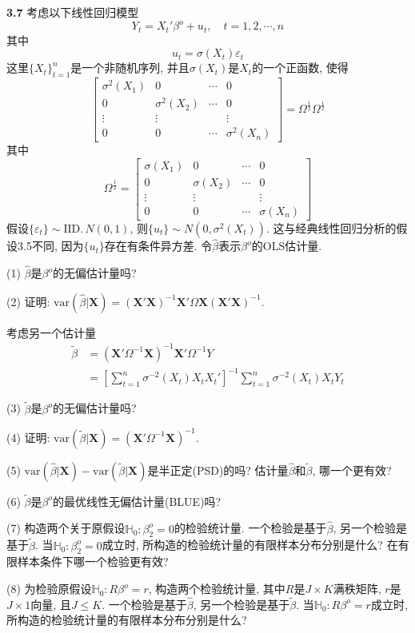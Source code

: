 \documentclass[cn,12pt,math=mtpro2,citestyle=gb7714-2015,bibstyle=gb7714-2015,twocol,mode=simple]{elegantbook}
\newcommand{\var}{\text{var}}
\newcommand{\hbeta}{\hat{\beta}}
\newcommand{\tbeta}{\tilde{\beta}}
\begin{document}
\textbf{3.7} 考虑以下线性回归模型
$$Y_t=X_t'\beta^o+u_t, \quad t=1,2,\cdots,n$$
其中
$$u_t=\sigma(X_t)\varepsilon_t$$
这里$\{X_t\}_{t=1}^n$是一个非随机序列, 并且$\sigma(X_t)$是$X_t$的一个正函数, 使得
$$\begin{bmatrix}
 \sigma^2(X_1) & 0 & \cdots & 0\\
 0 & \sigma^2(X_2) & \cdots & 0\\
 \vdots & \vdots &  & \vdots\\
 0 & 0 & \cdots & \sigma^2(X_n)
\end{bmatrix}=\Omega^{\frac{1}{2}}\Omega^{\frac{1}{2}}$$
其中
$$\Omega^{\frac{1}{2}}=\begin{bmatrix}
 \sigma(X_1) & 0 & \cdots & 0\\
 0 & \sigma(X_2) & \cdots & 0\\
 \vdots & \vdots &  & \vdots\\
 0 & 0 & \cdots & \sigma(X_n)
\end{bmatrix}$$
假设$\{\varepsilon_t\}\sim \text{IID.}\,N(0,1)$, 则$\{u_t\}\sim N(0,\sigma^2(X_t))$. 这与经典线性回归分析的假设3.5不同, 因为$\{u_t\}$存在有条件异方差. 令$\hbeta$表示$\beta^o$的OLS估计量.

(1) $\hbeta$是$\beta^o$的无偏估计量吗?

(2) 证明: $\var(\hbeta|\mathbf{X})=(\mathbf{X}'\mathbf{X})^{-1}\mathbf{X}'\Omega \mathbf{X}(\mathbf{X}'\mathbf{X})^{-1}$.

考虑另一个估计量
\begin{align*}
\tbeta&=(\mathbf{X}'\Omega^{-1}\mathbf{X})^{-1}\mathbf{X}'\Omega^{-1}Y \\
&=\left[\sum_{t=1}^{n}\sigma^{-2}(X_t)X_tX_t'\right]^{-1}\sum_{t=1}^{n}\sigma^{-2}(X_t)X_tY_t
\end{align*}

(3) $\tbeta$是$\beta^o$的无偏估计量吗?

(4) 证明: $\var(\tbeta|\mathbf{X})=(\mathbf{X}'\Omega^{-1}\mathbf{X})^{-1}$.

(5) $\var(\hbeta|\mathbf{X})-\var(\tbeta|\mathbf{X})$是半正定(PSD)的吗? 估计量$\hbeta$和$\tbeta$, 哪一个更有效?

(6) $\tbeta$是$\beta^o$的最优线性无偏估计量(BLUE)吗?

(7) 构造两个关于原假设$\mathbb{H}_0: \beta_2^o=0$的检验统计量. 一个检验是基于$\hbeta$, 另一个检验是基于$\tbeta$. 当$\mathbb{H}_0: \beta_2^o=0$成立时, 所构造的检验统计量的有限样本分布分别是什么? 在有限样本条件下哪一个检验更有效?

(8) 为检验原假设$\mathbb{H}_0: R\beta^o=r$, 构造两个检验统计量, 其中$R$是$J \times K$满秩矩阵, $r$是$J \times 1$向量, 且$J \leq K$. 一个检验是基于$\hbeta$, 另一个检验是基于$\tbeta$. 当$\mathbb{H}_0: R\beta^o=r$成立时, 所构造的检验统计量的有限样本分布分别是什么?
\end{document}
